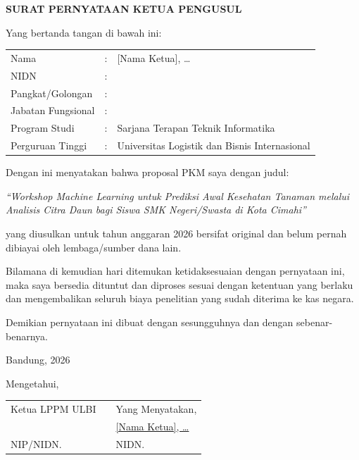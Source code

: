 
\begin{center}
    \textbf{SURAT PERNYATAAN KETUA PENGUSUL}
\end{center}

\vspace{0.5cm}

Yang bertanda tangan di bawah ini:

\begin{tabular}{lll}
    Nama            & : & {[Nama Ketua]}, \ldots \\
    NIDN            & : & \\
    Pangkat/Golongan & : & \\
    Jabatan Fungsional & : & \\
    Program Studi   & : & Sarjana Terapan Teknik Informatika \\
    Perguruan Tinggi & : & Universitas Logistik dan Bisnis Internasional \\
\end{tabular}

\vspace{0.5cm}

Dengan ini menyatakan bahwa proposal PKM saya dengan judul:

\begin{center}
    \textit{``Workshop Machine Learning untuk Prediksi Awal Kesehatan Tanaman melalui Analisis Citra Daun bagi Siswa SMK Negeri/Swasta di Kota Cimahi''}
\end{center}

yang diusulkan untuk tahun anggaran 2026 bersifat original dan belum pernah dibiayai oleh lembaga/sumber dana lain.

Bilamana di kemudian hari ditemukan ketidaksesuaian dengan pernyataan ini, maka saya bersedia dituntut dan diproses sesuai dengan ketentuan yang berlaku dan mengembalikan seluruh biaya penelitian yang sudah diterima ke kas negara.

Demikian pernyataan ini dibuat dengan sesungguhnya dan dengan sebenar-benarnya.

\vspace{1.5cm}

\begin{flushright}
Bandung, \hspace{3cm} 2026

\vspace{0.3cm}
Mengetahui,\\[2cm]

\begin{tabular}{p{5cm}p{1cm}p{5cm}}
    Ketua LPPM ULBI & & Yang Menyatakan, \\[2.5cm]
    \underline{\hspace{5cm}} & & \underline{{[Nama Ketua]}, \ldots} \\
    NIP/NIDN. & & NIDN. \\
\end{tabular}
\end{flushright}
